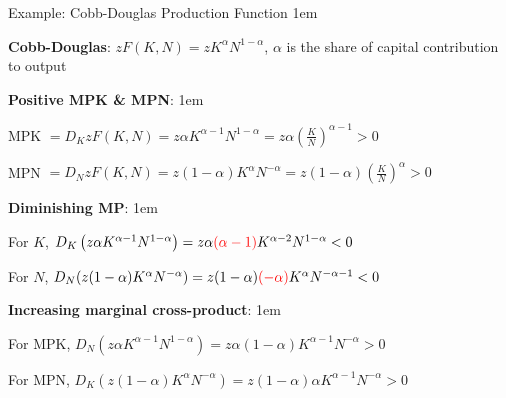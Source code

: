 \documentclass[11pt,aspectratio=43]{beamer} \usepackage[utf8]{inputenc}
\newcommand{\red}[1]{\textcolor{red}{#1}}
\let\olditemize=\itemize
\let\endolditemize=\enditemize
\renewenvironment{itemize}{\olditemize \itemsep1em}{\endolditemize}
\theoremstyle{definition}
\begin{document}
\begin{frame}{Example: Cobb-Douglas Production Function}
\label{slide:Example__Cobb_Douglas_Production_Function}
    \begin{itemize}
        \item \textbf{Cobb-Douglas}: $ z F( K, N ) = z K^{\alpha} N^{1-\alpha}$, $ \alpha $ is the share of capital contribution to output
        \item \textbf{Positive MPK \& MPN}:
        \begin{itemize}
            \item MPK $ = D_{K}z F( K, N ) = z \alpha K^{\alpha-1} N^{1-\alpha} = z \alpha \left( \frac{K}{N} \right)^{\alpha-1} > 0$
            \item MPN $ = D_{N}z F( K, N ) = z ( 1-\alpha ) K^{\alpha} N^{-\alpha} = z ( 1-\alpha ) \left( \frac{K}{N} \right)^{\alpha} > 0$
        \end{itemize}
        \item \textbf{Diminishing MP}:
        \begin{itemize}
            \item For $ K $, $ D_{K} \left( z \alpha K^{\alpha-1} N^{1-\alpha} \right) = z \alpha \red{( \alpha - 1 )} K^{\alpha - 2} N^{1-\alpha} < 0$
            \item For $ N $, $ D_{N} ( z ( 1-\alpha ) K^{\alpha} N^{-\alpha} ) = z ( 1-\alpha ) \red{( -\alpha )} K^{\alpha} N^{-\alpha-1} < 0$
        \end{itemize}
        \item \textbf{Increasing marginal cross-product}:
        \begin{itemize}
            \item For MPK, $ D_{N} ( z \alpha K^{\alpha-1} N^{1-\alpha} ) = z \alpha ( 1-\alpha ) K^{\alpha-1}N^{-\alpha} > 0$
            \item For MPN, $ D_{K} ( z ( 1-\alpha ) K^{\alpha} N^{-\alpha}  )  = z ( 1-\alpha ) \alpha K^{\alpha-1} N^{-\alpha} > 0$
        \end{itemize}
    \end{itemize}
\end{frame}
\end{document}
